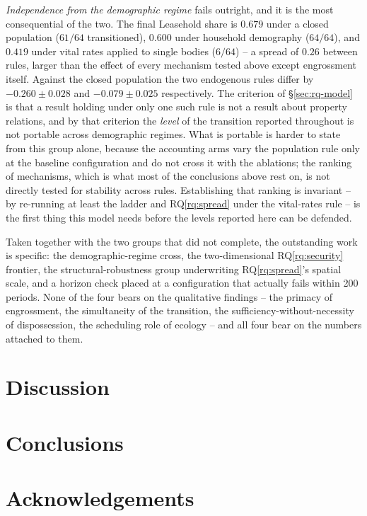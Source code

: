 \documentclass[11pt,english]{article}
\begin{document}
\emph{Independence from the demographic regime} fails outright, and it is the most consequential of the two. The final Leasehold share is $0.679$ under a closed population ($61/64$ transitioned), $0.600$ under household demography ($64/64$), and $0.419$ under vital rates applied to single bodies ($6/64$) -- a spread of $0.26$ between rules, larger than the effect of every mechanism tested above except engrossment itself. Against the closed population the two endogenous rules differ by $-0.260 \pm 0.028$ and $-0.079 \pm 0.025$ respectively. The criterion of \S\ref{sec:rq-model} is that a result holding under only one such rule is not a result about property relations, and by that criterion the \emph{level} of the transition reported throughout is not portable across demographic regimes. What is portable is harder to state from this group alone, because the accounting arms vary the population rule only at the baseline configuration and do not cross it with the ablations; the ranking of mechanisms, which is what most of the conclusions above rest on, is not directly tested for stability across rules. Establishing that ranking is invariant -- by re-running at least the ladder and RQ\ref{rq:spread} under the vital-rates rule -- is the first thing this model needs before the levels reported here can be defended.

Taken together with the two groups that did not complete, the outstanding work is specific: the demographic-regime cross, the two-dimensional RQ\ref{rq:security} frontier, the structural-robustness group underwriting RQ\ref{rq:spread}'s spatial scale, and a horizon check placed at a configuration that actually fails within 200 periods. None of the four bears on the qualitative findings -- the primacy of engrossment, the simultaneity of the transition, the sufficiency-without-necessity of dispossession, the scheduling role of ecology -- and all four bear on the numbers attached to them.

\section{Discussion}
\label{sec:discussion}
\section{Conclusions}

\section{Acknowledgements}



\end{document}
